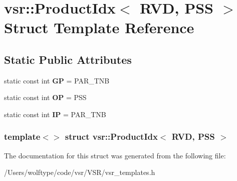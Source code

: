 \hypertarget{structvsr_1_1_product_idx_3_01_r_v_d_00_01_p_s_s_01_4}{\section{vsr\-:\-:Product\-Idx$<$ R\-V\-D, P\-S\-S $>$ Struct Template Reference}
\label{structvsr_1_1_product_idx_3_01_r_v_d_00_01_p_s_s_01_4}
}
\subsection*{Static Public Attributes}
\begin{DoxyCompactItemize}
\item 
\hypertarget{structvsr_1_1_product_idx_3_01_r_v_d_00_01_p_s_s_01_4_abc7d72e7b5d81b779b939718b4c84c93}{static const int {\bfseries G\-P} = P\-A\-R\-\_\-\-T\-N\-B}\label{structvsr_1_1_product_idx_3_01_r_v_d_00_01_p_s_s_01_4_abc7d72e7b5d81b779b939718b4c84c93}

\item 
\hypertarget{structvsr_1_1_product_idx_3_01_r_v_d_00_01_p_s_s_01_4_a763b40e58605bde38b2d847549d879ef}{static const int {\bfseries O\-P} = P\-S\-S}\label{structvsr_1_1_product_idx_3_01_r_v_d_00_01_p_s_s_01_4_a763b40e58605bde38b2d847549d879ef}

\item 
\hypertarget{structvsr_1_1_product_idx_3_01_r_v_d_00_01_p_s_s_01_4_a456d0d5cfb1f71a8f298375a10c52cbf}{static const int {\bfseries I\-P} = P\-A\-R\-\_\-\-T\-N\-B}\label{structvsr_1_1_product_idx_3_01_r_v_d_00_01_p_s_s_01_4_a456d0d5cfb1f71a8f298375a10c52cbf}

\end{DoxyCompactItemize}
\subsubsection*{template$<$$>$ struct vsr\-::\-Product\-Idx$<$ R\-V\-D, P\-S\-S $>$}



The documentation for this struct was generated from the following file\-:\begin{DoxyCompactItemize}
\item 
/\-Users/wolftype/code/vsr/\-V\-S\-R/vsr\-\_\-templates.\-h\end{DoxyCompactItemize}
